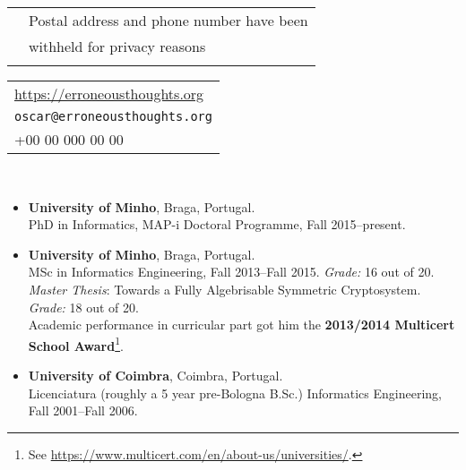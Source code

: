 \documentclass[a4paper,10pt]{extarticle}
\newenvironment{topic}[1]
   {{\noindent\large\bfseries\raisebox{0pt}[\height][1ex]{#1}\hrule\par}%
    \begin{list}{}{%
       \setlength{\leftmargin}{.0cm}}\item[]}
   {\end{list}\medskip}
\newenvironment{header}[1]
   {\centering{\noindent\large\bfseries\raisebox{0pt}[\height][1ex]{%
		 \Large\bfseries Curriculum Vit\ae\ --- #1\par}\hrule}%
		 \begin{center}}
		 {\end{center}\medskip}
\newlength{\leftheaderlength}\setlength{\leftheaderlength}{0.60\textwidth}
\newlength{\rightheaderlength}\setlength{\rightheaderlength}{0.40\textwidth}
\begin{document}
\begin{header}{Óscar Francisco Godinho Pereira} 
	\begin{minipage}[t]{\leftheaderlength}%
		\begin{tabular}{c l}
			\Letter  & Postal address and phone number have been\\
			         & withheld for privacy reasons\\
							 & \phantom{xpto}
		\end{tabular}
	\end{minipage}%
	\begin{minipage}[t]{\rightheaderlength}%
		\begin{tabular}{l}
			\url{https://erroneousthoughts.org}\\
			\texttt{oscar@erroneousthoughts.org}\\
			+00 00 000 00 00\\
		\end{tabular}
	\end{minipage}\\[1.5em]
\end{header}

\begin{topic}{Formal Education}
  \begin{itemize}[leftmargin=*]
    \item {\bfseries University of Minho}, Braga, Portugal.\\
      PhD in Informatics, MAP-i Doctoral Programme, Fall 2015--present.
    \item {\bfseries University of Minho}, Braga, Portugal.\\
			MSc in Informatics Engineering, Fall 2013--Fall 2015. \emph{Grade:} 16 out 
			of 20.\\
			\emph{Master Thesis}: Towards a Fully Algebrisable Symmetric Cryptosystem. 
			\emph{Grade:} 18 out of 20.\\
			Academic performance in curricular part got him the \textbf{2013/2014 
			Multicert School Award}\footnote{See 
			\url{https://www.multicert.com/en/about-us/universities/}.}.
    \item {\bfseries University of Coimbra}, Coimbra, Portugal.\\
			Licenciatura (roughly a 5 year pre-Bologna B.Sc.) Informatics Engineering, 
			Fall 2001--Fall 2006.
  \end{itemize}
\end{topic}
\end{document}
